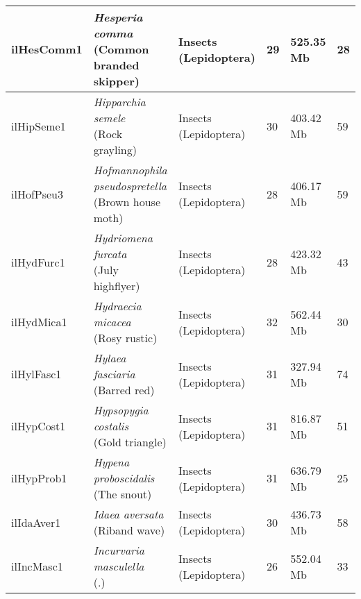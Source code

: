\begin{centering}
\begin{longtable}{l|l|l|l|l|l}
ilHesComm1 & \makecell[{l}]{\textit{Hesperia comma} \\ (Common branded skipper)} & \makecell[{l}]{Insects \\ (Lepidoptera)} & 29 & 525.35 Mb & 28  \\ \hline
ilHipSeme1 & \makecell[{l}]{\textit{Hipparchia semele} \\ (Rock grayling)} & \makecell[{l}]{Insects \\ (Lepidoptera)} & 30 & 403.42 Mb & 59  \\ \hline
ilHofPseu3 & \makecell[{l}]{\textit{Hofmannophila pseudospretella} \\ (Brown house moth)} & \makecell[{l}]{Insects \\ (Lepidoptera)} & 28 & 406.17 Mb & 59  \\ \hline
ilHydFurc1 & \makecell[{l}]{\textit{Hydriomena furcata} \\ (July highflyer)} & \makecell[{l}]{Insects \\ (Lepidoptera)} & 28 & 423.32 Mb & 43  \\ \hline
ilHydMica1 & \makecell[{l}]{\textit{Hydraecia micacea} \\ (Rosy rustic)} & \makecell[{l}]{Insects \\ (Lepidoptera)} & 32 & 562.44 Mb & 30  \\ \hline
ilHylFasc1 & \makecell[{l}]{\textit{Hylaea fasciaria} \\ (Barred red)} & \makecell[{l}]{Insects \\ (Lepidoptera)} & 31 & 327.94 Mb & 74  \\ \hline
ilHypCost1 & \makecell[{l}]{\textit{Hypsopygia costalis} \\ (Gold triangle)} & \makecell[{l}]{Insects \\ (Lepidoptera)} & 31 & 816.87 Mb & 51  \\ \hline
ilHypProb1 & \makecell[{l}]{\textit{Hypena proboscidalis} \\ (The snout)} & \makecell[{l}]{Insects \\ (Lepidoptera)} & 31 & 636.79 Mb & 25  \\ \hline
ilIdaAver1 & \makecell[{l}]{\textit{Idaea aversata} \\ (Riband wave)} & \makecell[{l}]{Insects \\ (Lepidoptera)} & 30 & 436.73 Mb & 58  \\ \hline
ilIncMasc1 & \makecell[{l}]{\textit{Incurvaria masculella} \\ (.)} & \makecell[{l}]{Insects \\ (Lepidoptera)} & 26 & 552.04 Mb & 33  \\ \hline

\end{longtable}
\end{centering}
